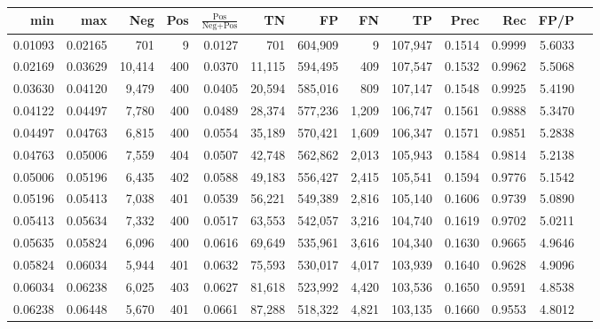 \begin{tabular}{rrrrrrrrrrrrr}
\toprule
    min &     max &    Neg & Pos & $\frac{\text{Pos}}{\text{Neg}+\text{Pos}}$ &      TN &      FP &      FN &      TP &   Prec &    Rec &   FP/P \\
\midrule
0.01093 & 0.02165 &    701 &   9 &                                     0.0127 &     701 & 604,909 &       9 & 107,947 & 0.1514 & 0.9999 & 5.6033 \\
0.02169 & 0.03629 & 10,414 & 400 &                                     0.0370 &  11,115 & 594,495 &     409 & 107,547 & 0.1532 & 0.9962 & 5.5068 \\
0.03630 & 0.04120 &  9,479 & 400 &                                     0.0405 &  20,594 & 585,016 &     809 & 107,147 & 0.1548 & 0.9925 & 5.4190 \\
0.04122 & 0.04497 &  7,780 & 400 &                                     0.0489 &  28,374 & 577,236 &   1,209 & 106,747 & 0.1561 & 0.9888 & 5.3470 \\
0.04497 & 0.04763 &  6,815 & 400 &                                     0.0554 &  35,189 & 570,421 &   1,609 & 106,347 & 0.1571 & 0.9851 & 5.2838 \\
0.04763 & 0.05006 &  7,559 & 404 &                                     0.0507 &  42,748 & 562,862 &   2,013 & 105,943 & 0.1584 & 0.9814 & 5.2138 \\
0.05006 & 0.05196 &  6,435 & 402 &                                     0.0588 &  49,183 & 556,427 &   2,415 & 105,541 & 0.1594 & 0.9776 & 5.1542 \\
0.05196 & 0.05413 &  7,038 & 401 &                                     0.0539 &  56,221 & 549,389 &   2,816 & 105,140 & 0.1606 & 0.9739 & 5.0890 \\
0.05413 & 0.05634 &  7,332 & 400 &                                     0.0517 &  63,553 & 542,057 &   3,216 & 104,740 & 0.1619 & 0.9702 & 5.0211 \\
0.05635 & 0.05824 &  6,096 & 400 &                                     0.0616 &  69,649 & 535,961 &   3,616 & 104,340 & 0.1630 & 0.9665 & 4.9646 \\
0.05824 & 0.06034 &  5,944 & 401 &                                     0.0632 &  75,593 & 530,017 &   4,017 & 103,939 & 0.1640 & 0.9628 & 4.9096 \\
0.06034 & 0.06238 &  6,025 & 403 &                                     0.0627 &  81,618 & 523,992 &   4,420 & 103,536 & 0.1650 & 0.9591 & 4.8538 \\
0.06238 & 0.06448 &  5,670 & 401 &                                     0.0661 &  87,288 & 518,322 &   4,821 & 103,135 & 0.1660 & 0.9553 & 4.8012 \\

\end{tabular}
